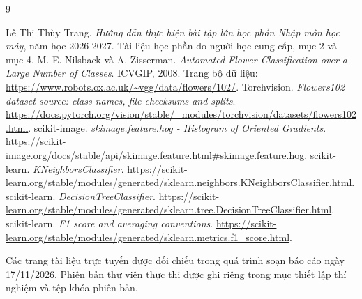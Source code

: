 \begin{thebibliography}{9}
\raggedright
{} Lê Thị Thùy Trang. \textit{Hướng dẫn thực hiện bài tập lớn học phần Nhập môn học máy}, năm học 2026-2027. Tài liệu học phần do người học cung cấp, mục 2 và mục 4.
 M.-E. Nilsback và A. Zisserman. \textit{Automated Flower Classification over a Large Number of Classes}. ICVGIP, 2008. Trang bộ dữ liệu: \url{https://www.robots.ox.ac.uk/~vgg/data/flowers/102/}.
 Torchvision. \textit{Flowers102 dataset source: class names, file checksums and splits}. \url{https://docs.pytorch.org/vision/stable/_modules/torchvision/datasets/flowers102.html}.
 scikit-image. \textit{skimage.feature.hog - Histogram of Oriented Gradients}. \url{https://scikit-image.org/docs/stable/api/skimage.feature.html#skimage.feature.hog}.
 scikit-learn. \textit{KNeighborsClassifier}. \url{https://scikit-learn.org/stable/modules/generated/sklearn.neighbors.KNeighborsClassifier.html}.
 scikit-learn. \textit{DecisionTreeClassifier}. \url{https://scikit-learn.org/stable/modules/generated/sklearn.tree.DecisionTreeClassifier.html}.
 scikit-learn. \textit{F1 score and averaging conventions}. \url{https://scikit-learn.org/stable/modules/generated/sklearn.metrics.f1_score.html}.
\end{thebibliography}
Các trang tài liệu trực tuyến được đối chiếu trong quá trình soạn báo cáo ngày 17/11/2026. Phiên bản thư viện thực thi được ghi riêng trong mục thiết lập thí nghiệm và tệp khóa phiên bản.
